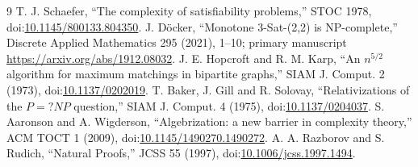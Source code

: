 \documentclass[11pt]{article}
\begin{document}
\begin{thebibliography}{9}
T. J. Schaefer, ``The complexity of satisfiability problems,'' STOC 1978,
doi:\href{https://doi.org/10.1145/800133.804350}{10.1145/800133.804350}.
J. D\"ocker, ``Monotone 3-Sat-(2,2) is NP-complete,'' Discrete Applied
Mathematics 295 (2021), 1--10; primary manuscript
\url{https://arxiv.org/abs/1912.08032}.
J. E. Hopcroft and R. M. Karp, ``An $n^{5/2}$ algorithm for maximum matchings
in bipartite graphs,'' SIAM J. Comput. 2 (1973),
doi:\href{https://doi.org/10.1137/0202019}{10.1137/0202019}.
T. Baker, J. Gill and R. Solovay, ``Relativizations of the $P=?NP$ question,''
SIAM J. Comput. 4 (1975), doi:\href{https://doi.org/10.1137/0204037}{10.1137/0204037}.
S. Aaronson and A. Wigderson, ``Algebrization: a new barrier in complexity
theory,'' ACM TOCT 1 (2009), doi:\href{https://doi.org/10.1145/1490270.1490272}{10.1145/1490270.1490272}.
A. A. Razborov and S. Rudich, ``Natural Proofs,'' JCSS 55 (1997),
doi:\href{https://doi.org/10.1006/jcss.1997.1494}{10.1006/jcss.1997.1494}.
\end{thebibliography}

\end{document}
